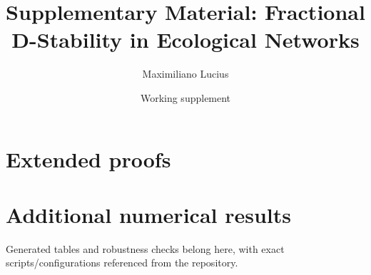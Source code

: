 \documentclass[11pt]{article}
\title{Supplementary Material: Fractional D-Stability in Ecological Networks}
\author{Maximiliano Lucius}
\date{Working supplement}
\begin{document}
\maketitle
\section{Extended proofs}

\section{Additional numerical results}
Generated tables and robustness checks belong here, with exact scripts/configurations referenced from the repository.
\end{document}
